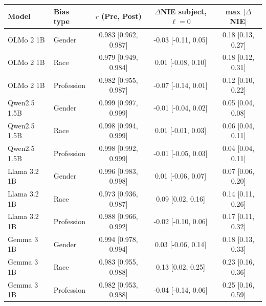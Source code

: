 \begin{tabular}{llccc}
\toprule
Model & Bias type & $r$ (Pre, Post) & $\Delta$NIE subject, $\ell=0$ & max $|\Delta$NIE$|$ \\
\midrule
OLMo 2 1B & Gender & 0.983 [0.962, 0.987] & -0.03 [-0.11, 0.05] & 0.18 [0.13, 0.27] \\
OLMo 2 1B & Race & 0.979 [0.949, 0.984] & 0.01 [-0.08, 0.10] & 0.18 [0.12, 0.31] \\
OLMo 2 1B & Profession & 0.982 [0.955, 0.987] & -0.07 [-0.14, 0.01] & 0.12 [0.10, 0.22] \\
Qwen2.5 1.5B & Gender & 0.999 [0.997, 0.999] & -0.01 [-0.04, 0.02] & 0.05 [0.04, 0.08] \\
Qwen2.5 1.5B & Race & 0.998 [0.994, 0.999] & 0.01 [-0.01, 0.03] & 0.06 [0.04, 0.11] \\
Qwen2.5 1.5B & Profession & 0.998 [0.992, 0.999] & -0.01 [-0.05, 0.03] & 0.04 [0.04, 0.11] \\
Llama 3.2 1B & Gender & 0.996 [0.983, 0.998] & 0.01 [-0.06, 0.07] & 0.07 [0.06, 0.20] \\
Llama 3.2 1B & Race & 0.973 [0.936, 0.987] & 0.09 [0.02, 0.16] & 0.14 [0.11, 0.26] \\
Llama 3.2 1B & Profession & 0.988 [0.966, 0.992] & -0.02 [-0.10, 0.06] & 0.17 [0.11, 0.32] \\
Gemma 3 1B & Gender & 0.994 [0.978, 0.994] & 0.03 [-0.06, 0.14] & 0.18 [0.13, 0.33] \\
Gemma 3 1B & Race & 0.983 [0.955, 0.988] & 0.13 [0.02, 0.25] & 0.23 [0.16, 0.36] \\
Gemma 3 1B & Profession & 0.982 [0.953, 0.988] & -0.04 [-0.14, 0.06] & 0.25 [0.16, 0.59] \\
\bottomrule
\end{tabular}
